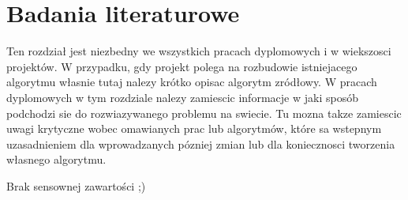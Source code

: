 \chapter{Badania literaturowe}

Ten rozdział jest niezbedny we wszystkich pracach dyplomowych i w wiekszosci projektów. W
przypadku, gdy projekt polega na rozbudowie istniejacego algorytmu własnie tutaj nalezy
krótko opisac algorytm zródłowy. W pracach dyplomowych w tym rozdziale nalezy zamiescic
informacje w jaki sposób podchodzi sie do rozwiazywanego problemu na swiecie. Tu mozna
takze zamiescic uwagi krytyczne wobec omawianych prac lub algorytmów, które sa wstepnym
uzasadnieniem dla wprowadzanych pózniej zmian lub dla koniecznosci tworzenia własnego
algorytmu.

Brak sensownej zawartości ;)


